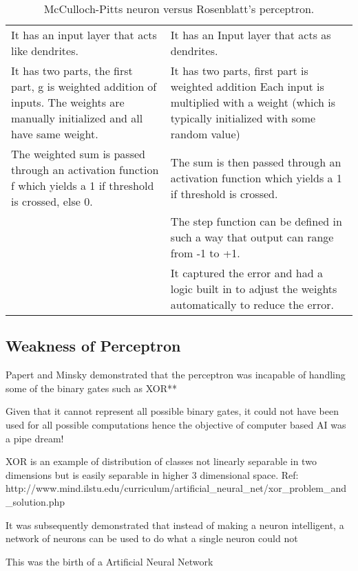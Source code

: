 	\begin{table}
        \centering
        \caption[McCulloch-Pitts neuron versus Rosenblatt's perceptron]{McCulloch-Pitts neuron versus Rosenblatt's perceptron.}
        \label{tab:mccullochpittsversusrosenblatt}
		\begin{tabular}{|p{0.5\qandatextwidth-2\tabcolsep}|p{0.5\qandatextwidth-2\tabcolsep}|} \hline
				\tablecolumnheadervlinesone{McCulloch-Pitts Neuron} & \tablecolumnheadervlinestwo{Rosenblatt's Perceptron} \\ \hline
				It has an input layer that acts like dendrites. &
				It has an Input layer that acts as dendrites. \\ \hline
				It has two parts, the first part, g is weighted addition of inputs. The weights are manually initialized and all have same weight. &
				It has two parts, first part is weighted addition Each input is multiplied with a weight (which is typically initialized with some random value) \\ \hline
				The weighted sum is passed through an activation function f which yields a 1 if threshold is crossed, else 0. &
				The sum is then passed through an activation function which yields a 1 if threshold is crossed. \\ \hline
				&
				The step function can be defined in such a way that output can range from -1 to +1. \\ \hline
				&
				It captured the error and had a logic built in to adjust the weights automatically to reduce the error. \\ \hline
		\end{tabular}
	\end{table}

	\subsection{Weakness of Perceptron}
	\begin{bulletedlist}
		\item Papert and Minsky demonstrated that the perceptron was incapable of handling some of the binary gates such as XOR**
		\item Given that it cannot represent all possible binary gates, it could not have been used for all possible computations hence the objective of computer based AI was a pipe dream!
		\item XOR is an example of distribution of classes not linearly separable in two dimensions but is easily separable in higher 3 dimensional space. Ref: http://www.mind.ilstu.edu/curriculum/artificial\_neural\_net/xor\_problem\_and\_solution.php
		\item It was subsequently demonstrated that instead of making a neuron intelligent, a network of neurons can be used to do what a single neuron could not
		\item This was the birth of a Artificial Neural Network
	\end{bulletedlist}

